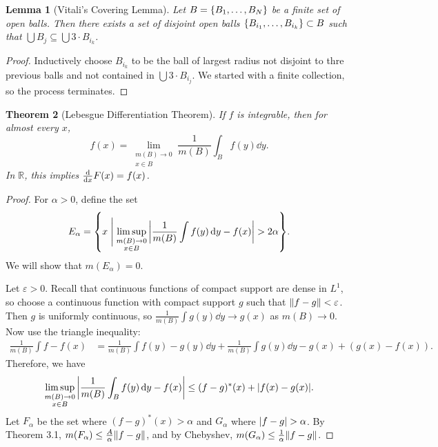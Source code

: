 \documentclass[leqno, openany]{memoir}
\newtheorem{thm}{Theorem}[chapter]
\newtheorem{lem}[thm]{Lemma}
\theoremstyle{definition}
\theoremstyle{remark}
\theoremstyle{plain}
\theoremstyle{definition}
\theoremstyle{remark}
\newcommand{\R}{\mathbb{R}}
\newcommand{\ep}{\varepsilon}
\begin{document}
\begin{lem}[Vitali's Covering Lemma] Let $B = \qty{B_1, \ldots, B_N}$ be a
    finite set of open balls. Then there exists a set of disjoint open balls
    $\qty{B_{i_1}, \ldots, B_{i_k}} \subset B$ such that $\bigcup B_j \subseteq
    \bigcup 3 \cdot B_{i_k}$.  \end{lem}

\begin{proof} Inductively choose $B_{i_k}$ to be the ball of largest radius not
disjoint to thre previous balls and not contained in $\bigcup 3 \cdot B_{i_j}$.
We started with a finite collection, so the process terminates.  \end{proof}

\begin{thm}[Lebesgue Differentiation Theorem] If $f$ is integrable, then for
    almost every $x$, \[ f(x) = \lim_{\substack{m(B) \to 0 \\ x \in B}}
    \frac{1}{m(B)} \int_B f(y) \dd{y}. \] In $\R$, this implies $\dv{x} F(x) =
f(x)$.  \end{thm}

\begin{proof} For $\alpha > 0$, define the set \[ E_{\alpha} = \qty{x
\mathrel{\Bigg|} \limsup_{\substack{m(B) \to 0 \\ x \in B}} \abs{\frac{1}{m(B)}
\int f(y) \dd{y} - f(x)} > 2\alpha}. \] We will show that $m(E_{\alpha}) = 0$.

    Let $\ep > 0$. Recall that continuous functions of compact support are
    dense in $L^1$, so choose a continuous function with compact support $g$
    such that $\norm{f-g} < \ep$. Then $g$ is uniformly continuous, so
    $\frac{1}{m(B)} \int g(y) \dd{y} \to g(x)$ as $m(B) \to 0$. Now use the
    triangle inequality: \begin{align*} \frac{1}{m(B)} \int f - f(x) &=
        \frac{1}{m(B)} \int f(y) - g(y) \dd{y} + \frac{1}{m(B)} \int g(y)
        \dd{y} - g(x) + (g(x) - f(x)).  \end{align*} Therefore, we have \[
    \limsup_{\substack{m(B) \to 0 \\ x \in B}} \abs{\frac{1}{m(B)} \int_B f(y)
\dd{y} - f(x)} \leq (f-g)^*(x) + \abs{f(x) - g(x)}. \] Let $F_{\alpha}$ be the
set where $(f-g)^*(x) > \alpha$ and $G_{\alpha}$ where $\abs{f - g} > \alpha$.
By Theorem 3.1, $m(F_{\alpha}) \leq \frac{A}{\alpha} \norm{f-g}$, and by
Chebyshev, $m(G_{\alpha}) \leq \frac{1}{\alpha} \norm{f-g}$.  \end{proof}
\end{document}
